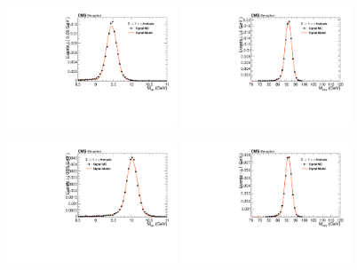 \begin{figure}[!htbp]
\begin{center}


\includegraphics[width=0.45\textwidth]{figures/fitPlotFiles2D/ZToUpsilonPhotonSignalAndBackgroundFit/mMuMNU_ZToUpsilon1SPhotonSignalAndBackgroundFit_Signal_Cat3}\hspace*{1.cm}
\includegraphics[width=0.45\textwidth]{figures/fitPlotFiles2D/ZToUpsilonPhotonSignalAndBackgroundFit/mHZ_ZToUpsilon1SPhotonSignalAndBackgroundFit_Signal_Cat3_default}\hspace*{1.cm}

\includegraphics[width=0.45\textwidth]{figures/fitPlotFiles2D/ZToUpsilonPhotonSignalAndBackgroundFit/mMuMNU_ZToUpsilon2SPhotonSignalAndBackgroundFit_Signal_Cat3}\hspace*{1.cm}
\includegraphics[width=0.45\textwidth]{figures/fitPlotFiles2D/ZToUpsilonPhotonSignalAndBackgroundFit/mHZ_ZToUpsilon2SPhotonSignalAndBackgroundFit_Signal_Cat3_default}\hspace*{1.cm}


\end{center}
\end{figure}
